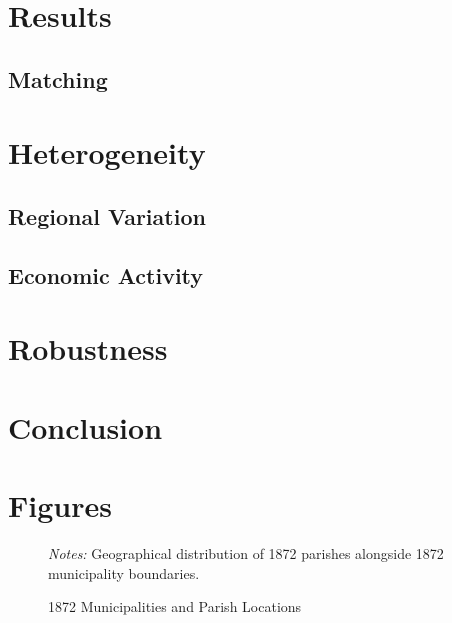 \documentclass{article}
\begin{document}
\section{Results}

\subsection{Matching}

\section{Heterogeneity}

\subsection{Regional Variation}

\subsection{Economic Activity}

\section{Robustness}

\section{Conclusion}

\clearpage



\printbibliography

\clearpage

\section*{Figures}

\begin{figure}[h!]
  \caption{1872 Municipalities and Parish Locations}
  \begin{center}
  \textit{Notes:} Geographical distribution of 1872 parishes alongside 1872 municipality boundaries.
  \end{center}
  \label{fig:parishes_1872}
\end{figure}
\end{document}
